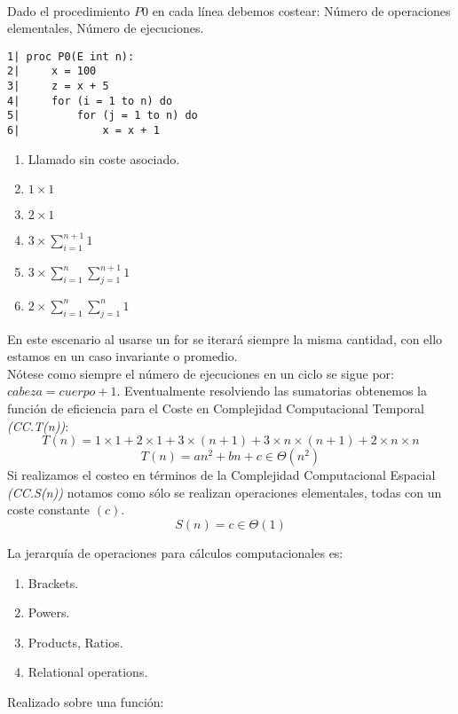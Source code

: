 \begin{example}~
	\\

	Dado el procedimiento $P0$ en cada línea debemos costear: Número de operaciones elementales, Número de ejecuciones.
	\begin{multicols}{2}
		\begin{lstlisting}
1| proc P0(E int n):
2|     x = 100
3|     z = x + 5
4|     for (i = 1 to n) do
5|         for (j = 1 to n) do
6|             x = x + 1
        \end{lstlisting}
		\columnbreak
		\begin{enumerate}
			\item Llamado sin coste asociado.
			\item $1\times1$
			\item $2\times1$
			\item $3\times\sum_{i=1}^{n+1}1$
			\item $3\times\sum_{i=1}^{n}\sum_{j=1}^{n+1}1$
			\item $2\times\sum_{i=1}^{n}\sum_{j=1}^{n}1$
		\end{enumerate}
	\end{multicols}
	En este escenario al usarse un for se iterará siempre la misma cantidad, con ello estamos en un caso invariante o promedio.
	\\Nótese como siempre el número de ejecuciones en un ciclo se sigue por: $cabeza=cuerpo+1$.
	Eventualmente resolviendo las sumatorias obtenemos la función de eficiencia para el Coste en Complejidad Computacional Temporal \textit{(CC.T(n))}:
	$$
		T(n)=1\times1+2\times1+3\times(n+1)+3\times n\times(n+1)+2\times n\times n
	$$ $$
		T(n)=an^2+bn+c\in \Theta(n^2)
	$$
	Si realizamos el costeo en términos de la Complejidad Computacional Espacial \textit{(CC.S(n))} notamos como sólo se realizan operaciones elementales, todas con un coste constante $(c)$.
	$$
		S(n)=c\in\Theta(1)
	$$
\end{example}

La jerarquía de operaciones para cálculos computacionales es:
\begin{enumerate}
	\item Brackets.
	\item Powers.
	\item Products, Ratios.
	\item Relational operations.
\end{enumerate}

Realizado sobre una función:
